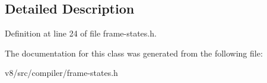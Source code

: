 \subsection{Detailed Description}


Definition at line 24 of file frame-\/states.\+h.



The documentation for this class was generated from the following file\+:\begin{DoxyCompactItemize}
\item 
v8/src/compiler/frame-\/states.\+h\end{DoxyCompactItemize}
